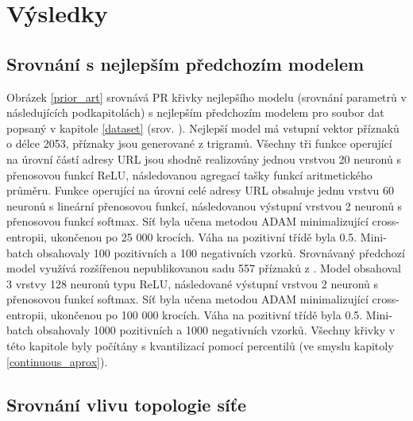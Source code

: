 \chapter{Výsledky}

\section{Srovnání s nejlepším předchozím modelem}\label{prior_art_comparison}
Obrázek \ref{prior_art} srovnává PR křivky nejlepšího modelu (srovnání parametrů v následujících podkapitolách) s nejlepším předchozím modelem pro soubor dat popsaný v kapitole \ref{dataset} (srov. \cite{machlica_learning_2017}). Nejlepší model má vstupní vektor příznaků o délce 2053, příznaky jsou generované z trigramů. Všechny tři funkce operující na úrovní částí adresy URL jsou shodně realizovány jednou vrstvou 20 neuronů s přenosovou funkcí ReLU, následovanou agregací tašky funkcí aritmetického průměru. Funkce operující na úrovni celé adresy URL obsahuje jednu vrstvu 60 neuronů s lineární přenosovou funkcí, následovanou výstupní vrstvou 2 neuronů s přenosovou funkcí softmax. Síť byla učena metodou ADAM minimalizující cross-entropii, ukončenou po 25 000 krocích. Váha na pozitivní třídě byla 0.5. Mini-batch obsahovaly 100 pozitivních a 100 negativních vzorků. Srovnávaný předchozí model využívá rozšířenou nepublikovanou sadu 557 příznaků z \cite{machlica_learning_2017}. Model obsahoval 3 vrstvy 128 neuronů typu ReLU, následované výstupní vrstvou 2 neuronů s přenosovou funkcí softmax. Síť byla učena metodou ADAM minimalizující cross-entropii, ukončenou po 100 000 krocích. Váha na pozitivní třídě byla 0.5. Mini-batch obsahovaly 1000 pozitivních a 1000 negativních vzorků. Všechny křivky v této kapitole byly počítány s kvantilizací pomocí percentilů (ve smyslu kapitoly \ref{continuous_aprox}).


\section{Srovnání vlivu topologie síťe}

